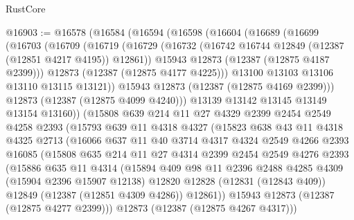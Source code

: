 \begin{lexlean}{RustCore}
\begin{coremodule}
@16903 := @16578
    (@16584
      (@16594
        (@16598
          (@16604
            (@16689
              (@16699
                (@16703
                  (@16709
                    (@16719
                      (@16729
                        (@16732 (@16742 @16744 @12849 (@12387 (@12851 @4217 @4195)) @12861))
                        @15943
                        @12873
                        (@12387 (@12875 @4187 @2399)))
                      @12873
                      (@12387 (@12875 @4177 @4225)))
                    @13100
                    @13103
                    @13106
                    @13110
                    @13115
                    @13121))
                @15943
                @12873
                (@12387 (@12875 @4169 @2399)))
              @12873
              (@12387 (@12875 @4099 @4240)))
            @13139
            @13142
            @13145
            @13149
            @13154
            @13160))
        (@15808
          @639
          @214
          @11
          @27
          @4329
          @2399
          @2454
          @2549
          @4258
          @2393
          (@15793
            @639
            @11
            @4318
            @4327
            (@15823
              @638
              @43
              @11
              @4318
              @4325
              @2713
              (@16066
                @637
                @11
                @40
                @3714
                @4317
                @4324
                @2549
                @4266
                @2393
                @16085
                (@15808
                  @635
                  @214
                  @11
                  @27
                  @4314
                  @2399
                  @2454
                  @2549
                  @4276
                  @2393
                  (@15886
                    @635
                    @11
                    @4314
                    (@15894
                      @409
                      @98
                      @11
                      @2396
                      @2488
                      @4285
                      @4309
                      (@15904 @2396 @15907 @12138)
                      @12820
                      @12828
                      (@12831 (@12843 @409))
                      @12849
                      (@12387 (@12851 @4309 @4286))
                      @12861))
                  @15943
                  @12873
                  (@12387 (@12875 @4277 @2399)))
                @12873
                (@12387 (@12875 @4267 @4317)))

\end{coremodule}
\end{lexlean}
